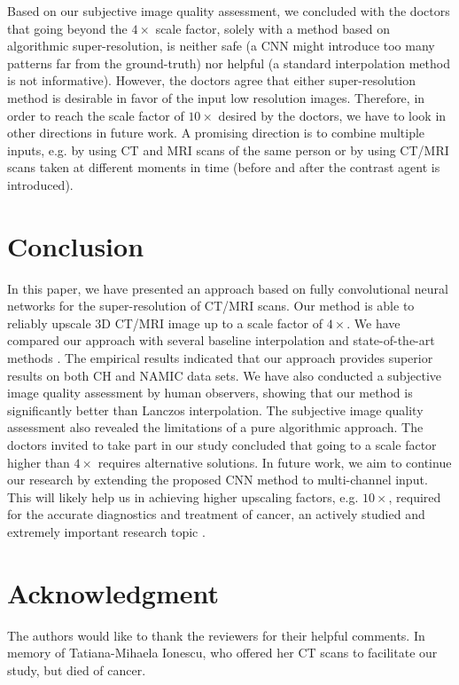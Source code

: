 \documentclass{ieeeaccess}
\begin{document}
Based on our subjective image quality assessment, we concluded with the doctors that going beyond the $4\times$ scale factor, solely with a method based on algorithmic super-resolution, is neither safe (a CNN might introduce too many patterns far from the ground-truth) nor helpful (a standard interpolation method is not informative). However, the doctors agree that either super-resolution method is desirable in favor of the input low resolution images. Therefore, in order to reach the scale factor of $10\times$ desired by the doctors, we have to look in other directions in future work. A promising direction is to combine multiple inputs, e.g. by using CT and MRI scans of the same person or by using CT/MRI scans taken at different moments in time (before and after the contrast agent is introduced).

\section{Conclusion}
\label{sec_Conclusion}

In this paper, we have presented an approach based on fully convolutional neural networks for the super-resolution of CT/MRI scans. Our method is able to reliably upscale 3D CT/MRI image up to a scale factor of $4\times$. We have compared our approach with several baseline interpolation and state-of-the-art methods \cite{Du-AS-2019,Pham-CMIG-2019,You-TMI-2019,ZENG-CBM-2018}. The empirical results indicated that our approach provides superior results on both CH and NAMIC data sets. We have also conducted a subjective image quality assessment by human observers, showing that our method is significantly better than Lanczos interpolation. The subjective image quality assessment also revealed the limitations of a pure algorithmic approach. The doctors invited to take part in our study concluded that going to a scale factor higher than $4\times$ requires alternative solutions. In future work, we aim to continue our research by extending the proposed CNN method to multi-channel input. This will likely help us in achieving higher upscaling factors, e.g. $10\times$, required for the accurate diagnostics and treatment of cancer, an actively studied and extremely important research topic \cite{Popa-RRP-2014,Sardari-EBM-2010}.

\section*{Acknowledgment}
The authors would like to thank the reviewers for their helpful comments. In memory of Tatiana-Mihaela Ionescu, who offered her CT scans to facilitate our study, but died of cancer.



\ifCLASSOPTIONcaptionsoff
  \newpage
\fi














 












\EOD
\end{document}
